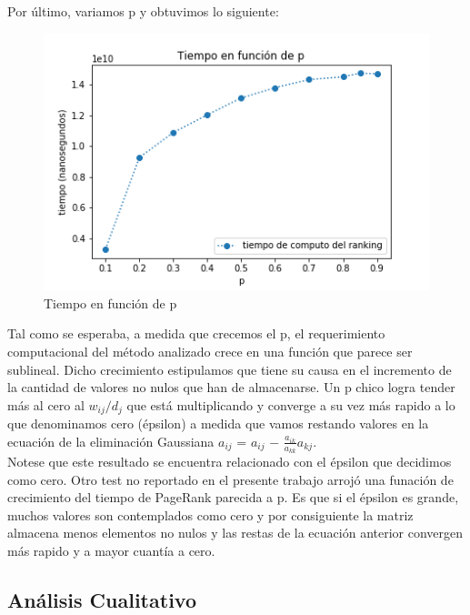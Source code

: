 Por último, variamos p y obtuvimos lo siguiente:

\begin{figure}[H]
   \begin{center}
     \includegraphics{img/tiempo_p.png} 
  \end{center}
\caption{Tiempo en función de p} \label{fig:exp1-p}
\end{figure}


Tal como se esperaba, a medida que crecemos el p, el requerimiento computacional del método analizado crece en una función que parece ser sublineal. Dicho crecimiento estipulamos que tiene su causa en el incremento de la cantidad de valores no nulos que han de almacenarse. Un p chico logra tender más al cero al $w_{ij}/d_{j}$ que está multiplicando y converge a su vez más rapido a lo que denominamos cero (épsilon) a medida que vamos restando valores en la ecuación de la eliminación Gaussiana $a_{ij}$ = $a_{ij}$ $-$ $\frac{a_{ik}}{a_{kk}} a_{kj}$. \\

Notese que este resultado se encuentra relacionado con el épsilon que decidimos como cero. Otro test no reportado en el presente trabajo arrojó una funación de crecimiento del tiempo de PageRank parecida a p. Es que si el épsilon es grande, muchos valores son contemplados como cero y por consiguiente la matriz almacena menos elementos no nulos y las restas de la ecuación anterior convergen más rapido y a mayor cuantía a cero. \\

\newpage

\subsection{Análisis Cualitativo}

